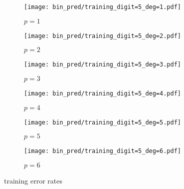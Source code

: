 \begin{figure}[h!]
    \begin{subfigure}[t]{0.49\textwidth}
        \centering
        \texttt{[image: bin\_pred/training\_digit=5\_deg=1.pdf]} 
        \caption{$p = 1$}
    \end{subfigure}
    \hfill
    \begin{subfigure}[t]{0.49\textwidth}
        \centering
        \texttt{[image: bin\_pred/training\_digit=5\_deg=2.pdf]} 
        \caption{$p = 2$}
    \end{subfigure}
    \par\bigskip
        \begin{subfigure}[t]{0.49\textwidth}
        \centering
        \texttt{[image: bin\_pred/training\_digit=5\_deg=3.pdf]} 
        \caption{$p = 3$}
    \end{subfigure}
    \hfill
    \begin{subfigure}[t]{0.49\textwidth}
        \centering
        \texttt{[image: bin\_pred/training\_digit=5\_deg=4.pdf]} 
        \caption{$p = 4$}
    \end{subfigure}
    \par\bigskip
        \begin{subfigure}[t]{0.49\textwidth}
        \centering
        \texttt{[image: bin\_pred/training\_digit=5\_deg=5.pdf]} 
        \caption{$p = 5$}
    \end{subfigure}
    \hfill
    \begin{subfigure}[t]{0.49\textwidth}
        \centering
        \texttt{[image: bin\_pred/training\_digit=5\_deg=6.pdf]} 
        \caption{$p = 6$}
    \end{subfigure}
    \caption{training error rates}
\end{figure}


